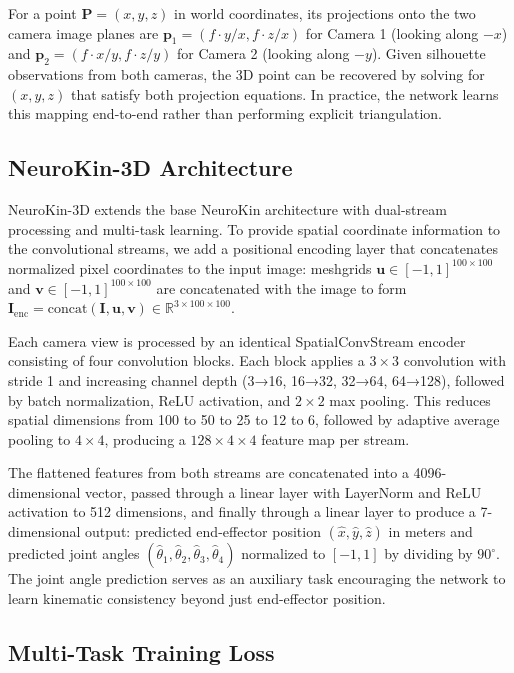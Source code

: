 \documentclass[12pt,a4paper,oneside]{report}
\begin{document}
For a point $\mathbf{P} = (x, y, z)$ in world coordinates, its projections onto the two camera image planes are $\mathbf{p}_1 = (f \cdot y/x, f \cdot z/x)$ for Camera 1 (looking along $-x$) and $\mathbf{p}_2 = (f \cdot x/y, f \cdot z/y)$ for Camera 2 (looking along $-y$). Given silhouette observations from both cameras, the 3D point can be recovered by solving for $(x, y, z)$ that satisfy both projection equations. In practice, the network learns this mapping end-to-end rather than performing explicit triangulation.

\subsection{NeuroKin-3D Architecture}
\label{subsec:neurokin_3d_architecture}

NeuroKin-3D extends the base NeuroKin architecture with dual-stream processing and multi-task learning. To provide spatial coordinate information to the convolutional streams, we add a positional encoding layer that concatenates normalized pixel coordinates to the input image: meshgrids $\mathbf{u} \in [-1, 1]^{100 \times 100}$ and $\mathbf{v} \in [-1, 1]^{100 \times 100}$ are concatenated with the image to form $\mathbf{I}_{\text{enc}} = \text{concat}(\mathbf{I}, \mathbf{u}, \mathbf{v}) \in \mathbb{R}^{3 \times 100 \times 100}$.

Each camera view is processed by an identical SpatialConvStream encoder consisting of four convolution blocks. Each block applies a $3 \times 3$ convolution with stride 1 and increasing channel depth (3→16, 16→32, 32→64, 64→128), followed by batch normalization, ReLU activation, and $2 \times 2$ max pooling. This reduces spatial dimensions from 100 to 50 to 25 to 12 to 6, followed by adaptive average pooling to $4 \times 4$, producing a $128 \times 4 \times 4$ feature map per stream.

The flattened features from both streams are concatenated into a 4096-dimensional vector, passed through a linear layer with LayerNorm and ReLU activation to 512 dimensions, and finally through a linear layer to produce a 7-dimensional output: predicted end-effector position $(\hat{x}, \hat{y}, \hat{z})$ in meters and predicted joint angles $(\hat{\theta}_1, \hat{\theta}_2, \hat{\theta}_3, \hat{\theta}_4)$ normalized to $[-1, 1]$ by dividing by $90^\circ$. The joint angle prediction serves as an auxiliary task encouraging the network to learn kinematic consistency beyond just end-effector position.

\subsection{Multi-Task Training Loss}
\label{subsec:multi_task_training_loss}
\end{document}
